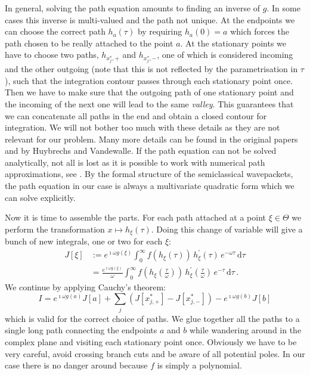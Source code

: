 \documentclass[a4paper,10pt]{article}
\begin{document}
In general, solving the path equation amounts to finding an inverse of $g$. In some cases
this inverse is multi-valued and the path not unique. At the endpoints we can
choose the correct path $h_a(\tau)$ by requiring $h_a(0) = a$ which forces the
path chosen to be really attached to the point $a$. At the stationary points we have
to choose two paths, $h_{x^{*}_j,+}$ and $h_{x^{*}_j,-}$, one of which is considered
incoming and the other outgoing (note that this is not reflected by the parametrisation
in $\tau$), such that the integration contour passes through each stationary point once.
Then we have to make sure that the outgoing path of one stationary point
and the incoming of the next one will lead to the same \emph{valley}. This guarantees
that we can concatenate all paths in the end and obtain a closed contour for integration.
We will not bother too much with these details as they are not relevant for our problem.
Many more details can be found in the original papers \cite{HV_hoq} and \cite{HV_cub} by
Huybrechs and Vandewalle. If the path equation can not be solved analytically, not
all is lost as it is possible to work with numerical path approximations, see \cite{AH_nsd_pa}.
By the formal structure of the semiclassical wavepackets, the path equation in our case is always
a multivariate quadratic form which we can solve explicitly.

Now it is time to assemble the parts. For each path attached at a point $\xi \in \Theta$
we perform the transformation $x \mapsto h_{\xi}(\tau)$. Doing this change of variable
will give a bunch of new integrals, one or two for each $\xi$:
\begin{equation} \label{eq:single_path_integral}
\begin{split}
  J[\xi] & := e^{\imath \omega g(\xi)}
              \int_{0}^{\infty}
                f(h_{\xi}(\tau)) \,
                h_{\xi}^{\prime}(\tau) \,
                e^{-\omega \tau} \,
              \mathrm{d}\tau \\
         & = \frac{e^{\imath \omega g(\xi)}}{\omega}
              \int_{0}^{\infty}
                f\left(h_{\xi}\left(\frac{\tau}{\omega}\right)\right) \,
                h_{\xi}^{\prime}\left(\frac{\tau}{\omega}\right) \,
                e^{-\tau} \,
              \mathrm{d}\tau \,.
\end{split}
\end{equation}
We continue by applying Cauchy's theorem:
\begin{equation} \label{eq:cauchy}
      I = e^{\imath\omega g(a)} J[a]
        + \sum_{j} \left(J[x_{j,+}^{*}] - J[x_{j,-}^{*}]\right)
        - e^{\imath\omega g(b)} J[b]
\end{equation}
which is valid for the correct choice of paths. We glue together all the paths
to a single long path connecting the endpoints $a$ and $b$ while wandering around
in the complex plane and visiting each stationary point once. Obviously we have to
be very careful, avoid crossing branch cuts and be aware of all potential poles.
In our case there is no danger around because $f$ is simply a polynomial.
\end{document}
